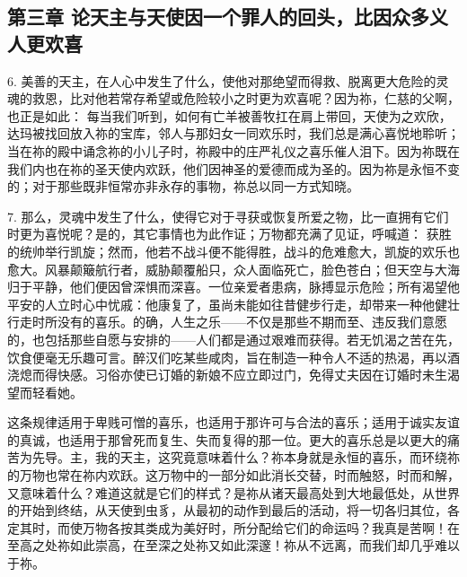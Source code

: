 
\subsection{第三章 论天主与天使因一个罪人的回头，比因众多义人更欢喜}

6. 美善的天主，在人心中发生了什么，使他对那绝望而得救、脱离更大危险的灵魂的救恩，比对他若常存希望或危险较小之时更为欢喜呢？因为祢，仁慈的父啊，也正是如此： 每当我们听到，如何有亡羊被善牧扛在肩上带回，天使为之欢欣，达玛被找回放入祢的宝库，邻人与那妇女一同欢乐时，我们总是满心喜悦地聆听；当在祢的殿中诵念祢的小儿子时，祢殿中的庄严礼仪之喜乐催人泪下。因为祢既在我们内也在祢的圣天使内欢跃，他们因神圣的爱德而成为圣的。因为祢是永恒不变的；对于那些既非恒常亦非永存的事物，祢总以同一方式知晓。\par

7. 那么，灵魂中发生了什么，使得它对于寻获或恢复所爱之物，比一直拥有它们时更为喜悦呢？是的，其它事情也为此作证；万物都充满了见证，呼喊道： 获胜的统帅举行凯旋；然而，他若不战斗便不能得胜，战斗的危难愈大，凯旋的欢乐也愈大。风暴颠簸航行者，威胁颠覆船只，众人面临死亡，脸色苍白；但天空与大海归于平静，他们便因曾深惧而深喜。一位亲爱者患病，脉搏显示危险；所有渴望他平安的人立时心中忧戚：他康复了，虽尚未能如往昔健步行走，却带来一种他健壮行走时所没有的喜乐。的确，人生之乐——不仅是那些不期而至、违反我们意愿的，也包括那些自愿与安排的——人们都是通过艰难而获得。若无饥渴之苦在先，饮食便毫无乐趣可言。醉汉们吃某些咸肉，旨在制造一种令人不适的热渴，再以酒浇熄而得快感。习俗亦使已订婚的新娘不应立即过门，免得丈夫因在订婚时未生渴望而轻看她。\par

这条规律适用于卑贱可憎的喜乐，也适用于那许可与合法的喜乐；适用于诚实友谊的真诚，也适用于那曾死而复生、失而复得的那一位。更大的喜乐总是以更大的痛苦为先导。主，我的天主，这究竟意味着什么？祢本身就是永恒的喜乐，而环绕祢的万物也常在祢内欢跃。这万物中的一部分如此消长交替，时而触怒，时而和解，又意味着什么？难道这就是它们的样式？是祢从诸天最高处到大地最低处，从世界的开始到终结，从天使到虫豸，从最初的动作到最后的活动，将一切各归其位，各定其时，而使万物各按其类成为美好时，所分配给它们的命运吗？我真是苦啊！在至高之处祢如此崇高，在至深之处祢又如此深邃！祢从不远离，而我们却几乎难以于祢。\par

